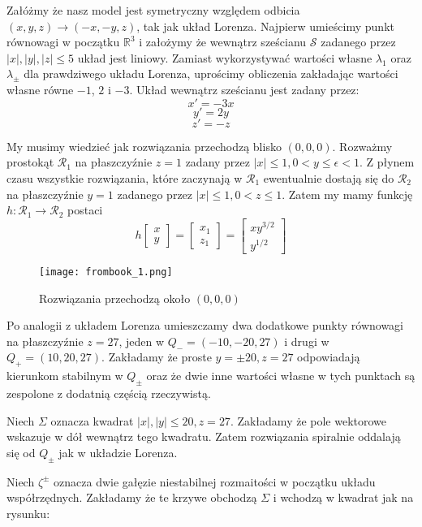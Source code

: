 \documentclass[12pt]{report}
\newcommand{\R}{\mathbb{R}}
\begin{document}
	\par Załóżmy że nasz model jest symetryczny względem odbicia $(x, y, z) \to (-x, -y, z)$, tak jak układ Lorenza. Najpierw umieścimy punkt równowagi w początku $\R^3$ i założymy że wewnątrz sześcianu $\mathcal{S}$ zadanego przez $\lvert x \rvert, \lvert y \rvert, \lvert z \rvert \le 5$ układ jest liniowy. Zamiast wykorzystywać wartości własne $\lambda_1$ oraz $\lambda_{\pm}$ dla prawdziwego układu Lorenza, uprościmy obliczenia zakładając wartości własne równe $-1$, $2$ i $-3$. Układ wewnątrz sześcianu jest zadany przez:
		\[ x' = -3x \]
		\[ y' = 2y \]
		\[ z' = -z \]
	\par My musimy wiedzieć jak rozwiązania przechodzą blisko $(0, 0, 0)$. Rozważmy prostokąt $\mathcal{R}_1$ na płaszczyźnie  $z = 1$ zadany przez $\lvert x \rvert \le 1, 0 < y \le \epsilon < 1$. Z płynem czasu wszystkie rozwiązania, które zaczynają w $\mathcal{R}_1$ ewentualnie dostają się do $\mathcal{R}_2$ na płaszczyźnie  $y = 1$ zadanego przez $\lvert x \rvert \le 1, 0 < z \le 1$. Zatem my mamy funkcję $h: \mathcal{R}_1 \to \mathcal{R}_2$ postaci
		\[ h \begin{bmatrix} x \\ y \end{bmatrix} = \begin{bmatrix} x_1 \\ z_1 \end{bmatrix} = \begin{bmatrix} xy^{3/2} \\ y^{1/2} \end{bmatrix} \]
	\begin{figure}[H]
		\centering
		\texttt{[image: frombook\_1.png]}
		\caption{Rozwiązania przechodzą około $(0, 0, 0)$ \cite{HSD}}
		\label{fig:frombook_1}
	\end{figure}
	\par Po analogii z układem Lorenza umieszczamy dwa dodatkowe punkty równowagi na płaszczyźnie $z = 27$, jeden w $Q_- = (-10, -20, 27)$ i drugi w $Q_+ = (10, 20, 27)$. Zakładamy że proste $y = \pm 20, z = 27$ odpowiadają kierunkom stabilnym w $Q_{\pm}$ oraz że dwie inne wartości własne w tych punktach są zespolone z dodatnią częścią rzeczywistą.
	\par Niech $\Sigma$ oznacza kwadrat $\lvert x \rvert, \lvert y \rvert \le 20, z = 27$. Zakładamy że pole wektorowe wskazuje w dół wewnątrz tego kwadratu. Zatem rozwiązania spiralnie oddalają się od $Q_{\pm}$ jak w układzie Lorenza.
	\par Niech $\zeta^{\pm}$ oznacza dwie gałęzie niestabilnej rozmaitości w początku układu współrzędnych. Zakładamy że te krzywe obchodzą $\Sigma$ i wchodzą w kwadrat jak na rysunku:
\end{document}
